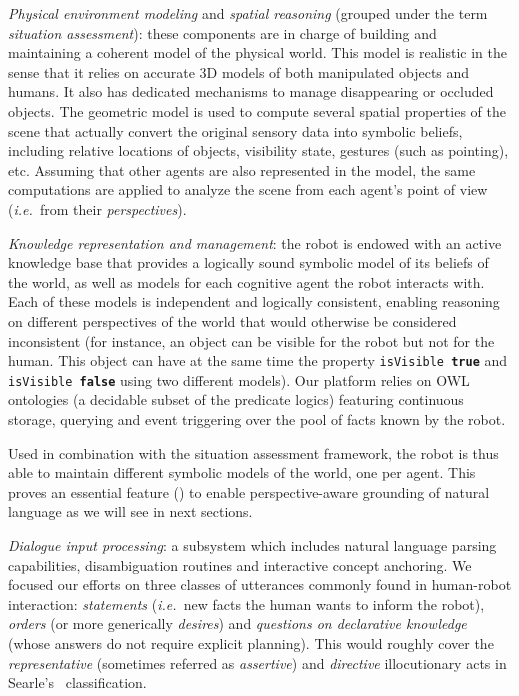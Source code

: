\documentclass[twocolumn]{svjour3}
\newcommand{\concept}[1]{{\footnotesize \texttt{#1}}}
\newcommand{\ie}{{\textit{i.e.~}}}
\begin{document}
\begin{inparaenum}[\itshape 1)]

\item \emph{Physical environment modeling} and \emph{spatial reasoning}
(grouped under the term \emph{situation assessment}): these components are in
charge of building and maintaining a coherent model of the physical world. This
model is realistic in the sense that it relies on accurate 3D models of both
manipulated objects and humans. It also has dedicated mechanisms to manage
disappearing or occluded objects.  The geometric model is used to compute
several spatial properties of the scene that actually convert the original
sensory data into symbolic beliefs, including relative locations of objects,
visibility state, gestures (such as pointing), etc.  Assuming that other agents
are also represented in the model, the same computations are applied to analyze
the scene from each agent's point of view (\ie from their \emph{perspectives}).

\item \emph{Knowledge representation and management}: the robot is endowed with
an active knowledge base that provides a logically sound symbolic model of its
beliefs of the world, as well as models for each cognitive agent the robot
interacts with. Each of these models is independent and logically consistent,
enabling reasoning on different perspectives of the world that would otherwise
be considered inconsistent (for instance, an object can be visible for the
robot but not for the human. This object can have at the same time the property
\concept{isVisible \textbf{true}} and \concept{isVisible \textbf{false}} using
two different models).  Our platform relies on OWL ontologies (a decidable
subset of the predicate logics) featuring continuous storage, querying and
event triggering over the pool of facts known by the robot.

Used in combination with the situation assessment framework, the robot is thus
able to maintain different symbolic models of the world, one per agent. This
proves an essential feature (\cite{Roy2005,Kruijff2010}) to enable
perspective-aware grounding of natural language as we will see in next
sections.


\item \emph{Dialogue input processing}: a subsystem which includes natural
language parsing capabilities, disambiguation routines and interactive concept
anchoring. We focused our efforts on three classes of utterances commonly found
in human-robot interaction: \emph{statements} (\ie new facts the human wants to
inform the robot), \emph{orders} (or more generically \emph{desires}) and
\emph{questions on declarative knowledge} (whose answers do not require
explicit planning). This would roughly cover the \emph{representative}
(sometimes referred as \emph{assertive}) and \emph{directive} illocutionary
acts in Searle's~\cite{Searle1976} classification.

\end{inparaenum}
\end{document}
